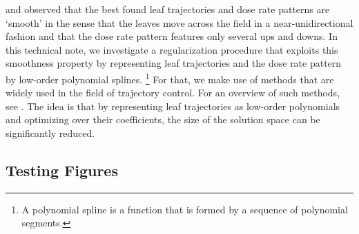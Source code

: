 \cite{balvertcraft} and  %
observed that the best found leaf trajectories and dose rate patterns are `smooth' in the sense that the leaves move across the field in a near-unidirectional fashion and that the dose rate pattern features only several ups and downs. %
In this technical note, we investigate a regularization procedure that exploits this smoothness property by representing leaf trajectories and the dose rate pattern by low-order polynomial splines. 
\footnote{A polynomial spline is a function that is formed by a sequence of polynomial segments.}
For that, we make use of methods that are widely used in the field of trajectory control. 
For an overview of such methods, see .
The idea is that by representing leaf trajectories as low-order polynomials and optimizing over their coefficients, the size of the solution space can be significantly reduced.

%


\subsection{Testing Figures}

